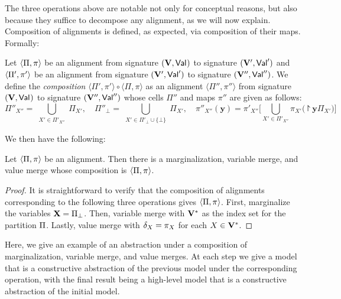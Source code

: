 \documentclass[twoside,11pt]{article}
\begin{document}
The three operations above are notable not only for conceptual reasons, but also because they suffice to decompose any alignment, as we will now explain. Composition of alignments is defined, as expected, via composition of their maps. Formally:
\begin{definition}
Let $\langle \Pi, \pi\rangle$ be an alignment from signature $(\mathbf{V}, \mathsf{Val}_{})$ to signature $(\mathbf{V}', \mathsf{Val}_{}')$
and $\langle \Pi', \pi'\rangle$ be an alignment from signature $(\mathbf{V}', \mathsf{Val}_{}')$ to signature $(\mathbf{V}'', \mathsf{Val}_{}'')$.
We define the \emph{composition} $\langle \Pi', \pi' \rangle \circ \langle \Pi, \pi\rangle$ as an alignment $\langle \Pi'',  \pi''\rangle$ from signature $(\mathbf{V}, \mathsf{Val}_{})$ to signature $(\mathbf{V}'', \mathsf{Val}_{}'')$ whose cells $\Pi''$ and maps $\pi''$ are given as follows:
\begin{equation*}
\Pi''_{X''} = \bigcup_{\substack{X' \in \Pi'_{X''}}} \Pi_{X'} , \quad
\Pi''_{\bot} = \bigcup_{\substack{X' \in \Pi'_{\bot} \cup \{\bot\}}} \Pi_{X'} , \quad
\pi''_{X''}(\mathbf{y}) = \pi'_{X''}\Big[ \bigcup_{X' \in \Pi'_{X''}} \pi_{X'}\big(\project{\mathbf{y}}{\Pi_{X'}}\big)\Big]
\end{equation*}
\end{definition}
We then have the following:
\begin{proposition}\label{prop:decompose}
\label{prop:transdecomp}
Let $\langle \Pi, \pi \rangle$ be an alignment. Then there is a marginalization, variable merge, and value merge whose composition is $\langle \Pi, \pi \rangle$.
\end{proposition}
\begin{proof}
It is straightforward to verify that the composition of alignments corresponding to the following three operations gives $\langle \Pi, \pi \rangle$.
First, marginalize the variables $\mathbf{X} = \Pi_\bot$. Then, variable merge with $\mathbf{V}^*$ as the index set for the partition $\Pi$. Lastly, value merge with $\delta_X = \pi_X$ for each $X \in \mathbf{V}^*$.
\end{proof}

 Here, we give an example of an abstraction under a composition of marginalization, variable merge, and value merges. At each step we give a model that is a constructive abstraction of the previous model under the corresponding operation, with the final result being a high-level model that is a constructive abstraction of the initial model.
\end{document}
